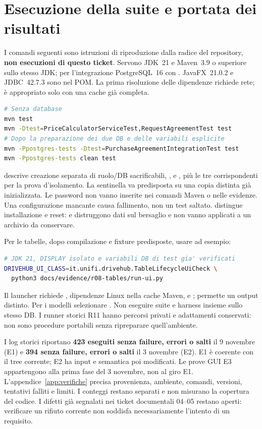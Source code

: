 \section{Esecuzione della suite e portata dei risultati}\label{sec:test-esecuzione}
I comandi seguenti sono istruzioni di riproduzione dalla radice del
repository, \textbf{non esecuzioni di questo ticket}. Servono JDK~21 e
Maven~3.9 o superiore sullo stesso JDK; per l'integrazione PostgreSQL~16
con . JavaFX~21.0.2 e JDBC~42.7.3 sono nel POM. La prima
risoluzione delle dipendenze richiede rete;  è appropriato solo
con una cache già completa.

\begin{lstlisting}[language=bash,numbers=none,gobble=0]
# Senza database
mvn test
mvn -Dtest=PriceCalculatorServiceTest,RequestAgreementTest test
# Dopo la preparazione dei due DB e delle variabili esplicite
mvn -Ppostgres-tests -Dtest=PurchaseAgreementIntegrationTest test
mvn -Ppostgres-tests clean test
\end{lstlisting}

 descrive creazione separata di ruolo/DB sacrificabili,
,  e
, più le tre corrispondenti
 per la prova d'isolamento. La sentinella
va predisposta su una copia distinta già inizializzata. Le password non
vanno inserite nei comandi Maven o nelle evidenze. Una configurazione
mancante causa fallimento, non un test saltato.
 distingue installazione e reset:
 e  distruggono dati sul bersaglio e non
vanno applicati a un archivio da conservare.

Per le tabelle, dopo compilazione e fixture predisposte, usare ad esempio:
\begin{lstlisting}[language=bash,numbers=none,gobble=0]
# JDK 21, DISPLAY isolato e variabili DB di test gia' verificati
DRIVEHUB_UI_CLASS=it.unifi.drivehub.TableLifecycleUiCheck \
  python3 docs/evidence/r08-tables/run-ui.py
\end{lstlisting}
Il launcher richiede , dipendenze Linux nella cache Maven,
\code{target/classes} e \code{target/test-classes};
 permette un output distinto.
Per i modelli selezionare .
Non eseguire suite e harness insieme sullo stesso DB. I runner storici
R11 hanno percorsi privati e adattamenti conservati: non sono procedure
portabili senza ripreparare quell'ambiente.

I log storici riportano \textbf{423 eseguiti senza failure, errori o salti}
il 9 novembre (E1) e \textbf{394 senza failure, errori o salti} il
3 novembre (E2). E1 è coerente con il tree corrente; E2 ha input e
semantica poi modificati. Le prove GUI E3 appartengono alla prima fase
del 3 novembre, non al giro E1. L'appendice~\ref{app:verifiche} precisa
provenienza, ambiente, comandi, versioni, tentativi falliti e limiti.
I conteggi restano separati e non misurano la copertura del codice.
I difetti già segnalati nei ticket documentali 04--05 restano aperti:
verificare un rifiuto corrente non soddisfa necessariamente l'intento
di un requisito.
\endgroup
